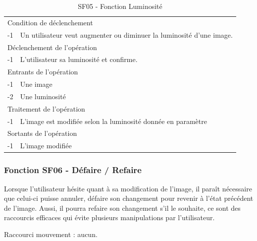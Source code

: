 \documentclass[a4paper]{article}
\begin{document}
\begin{table}[H]
  \centering
   \small
	\begin{tabular}{|c|p{12cm}|}
   		\hline
   			\rowcolor{lightgray}\multicolumn{2}{|c|}{\textbf{SF05 - Fonction Luminosité}} \\
   		\hline
   			\multicolumn{2}{|l|}{Condition de d\'eclenchement} \\
   		\hline
   			-1 & Un utilisateur veut augmenter ou diminuer la luminosité d'une image. \\
   		\hline
   			\multicolumn{2}{|l|}{D\'eclenchement de l'op\'eration} \\
   		\hline
   			-1 & L'utilisateur sa luminosité et confirme. \\
   		\hline
   			\multicolumn{2}{|l|}{Entrants de l'op\'eration} \\
   		\hline
        	-1 & Une image \\
   			-2 & Une luminosité \\ 	
        \hline
   			\multicolumn{2}{|l|}{Traitement de l'op\'eration} \\
  		\hline
   			-1 & L'image est modifiée selon la luminosité donnée en paramètre \\
   		\hline
   			\multicolumn{2}{|l|}{Sortants de l'op\'eration} \\
   		\hline
   			-1 & L'image modifiée \\
   		\hline
	\end{tabular}
  \caption{SF05 - Fonction Luminosité}
  \normalsize
  \label{tab:visu_img_luminosite}
\end{table}

\subsubsection{Fonction SF06 - Défaire / Refaire}

Lorsque l'utilisateur hésite quant à sa modification de l'image, il paraît nécessaire que celui-ci puisse annuler, défaire son changement pour revenir à l'état précédent de l'image. Aussi, il pourra refaire son changement s'il le souhaite, ce sont des raccourcis efficaces qui évite plusieurs manipulations par l'utilisateur.

Raccourci mouvement : aucun.
\end{document}
